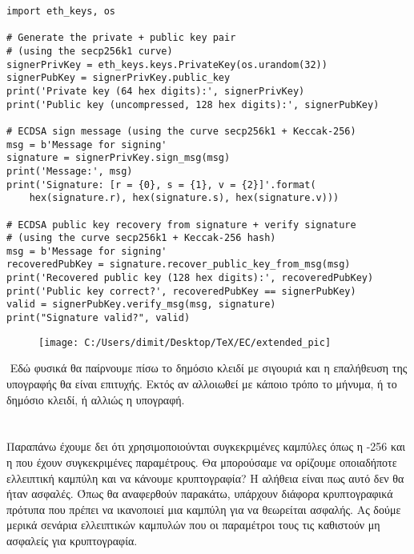 \documentclass[oneside,a4paper]{article}
\begin{document}
\vspace*{0.3cm}
\begin{lstlisting}
import eth_keys, os

# Generate the private + public key pair
# (using the secp256k1 curve)
signerPrivKey = eth_keys.keys.PrivateKey(os.urandom(32))
signerPubKey = signerPrivKey.public_key
print('Private key (64 hex digits):', signerPrivKey)
print('Public key (uncompressed, 128 hex digits):', signerPubKey)

# ECDSA sign message (using the curve secp256k1 + Keccak-256)
msg = b'Message for signing'
signature = signerPrivKey.sign_msg(msg)
print('Message:', msg)
print('Signature: [r = {0}, s = {1}, v = {2}]'.format(
    hex(signature.r), hex(signature.s), hex(signature.v)))

# ECDSA public key recovery from signature + verify signature
# (using the curve secp256k1 + Keccak-256 hash)
msg = b'Message for signing'
recoveredPubKey = signature.recover_public_key_from_msg(msg)
print('Recovered public key (128 hex digits):', recoveredPubKey)
print('Public key correct?', recoveredPubKey == signerPubKey)
valid = signerPubKey.verify_msg(msg, signature)
print("Signature valid?", valid)
\end{lstlisting}

\begin{figure}[H]
	\centering
	\texttt{[image: C:/Users/dimit/Desktop/TeX/EC/extended\_pic]}
\end{figure}

$ $\newline
Εδώ φυσικά θα παίρνουμε πίσω το δημόσιο κλειδί με σιγουριά και η επαλήθευση της υπογραφής θα είναι επιτυχής. Εκτός αν αλλοιωθεί με κάποιο τρόπο το μήνυμα, ή το δημόσιο κλειδί, ή αλλιώς η υπογραφή.

\pagebreak
\section{}

\vspace*{0.3cm}
\noindent Παραπάνω έχουμε δει ότι χρησιμοποιούνται συγκεκριμένες καμπύλες όπως η -256 και η  που έχουν συγκεκριμένες παραμέτρους. Θα μπορούσαμε να ορίζουμε οποιαδήποτε ελλειπτική καμπύλη και να κάνουμε κρυπτογραφία? Η αλήθεια είναι πως αυτό δεν θα ήταν ασφαλές. Όπως θα αναφερθούν παρακάτω, υπάρχουν διάφορα κρυπτογραφικά πρότυπα που πρέπει να ικανοποιεί μια καμπύλη για να θεωρείται ασφαλής. Ας δούμε μερικά σενάρια ελλειπτικών καμπυλών που οι παραμέτροι τους τις καθιστούν μη ασφαλείς για κρυπτογραφία.
\end{document}
